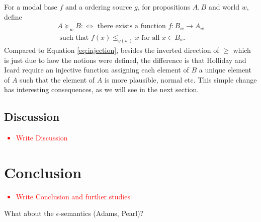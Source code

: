 \documentclass{article}
\theoremstyle{definition}
\newcommand\todo[1]{\textcolor{red}{#1}}
\begin{document}
For a modal base $f$ and a ordering source $g$, for propositions $A,B$ and world $w$, define
\begin{multline}
    \tag{2*}
    \label{eq:lifted-star}
    A \succeq_w B :\iff \text{ there exists a function } f: B_w \rightarrow A_w \\ \text{ such that } f(x) \leq_{g(w)} x \text{ for all } x \in B_w.
\end{multline}
Compared to Equation \ref{eq:injection}, besides the inverted direction of $\geq$ which is just due to how the notions were defined, the difference is that Holliday and Icard require an injective function assigning each element of $B$ a unique element of $A$ such that the element of $A$ is more plausible, normal etc. This simple change has interesting consequences, as we will see in the next section. 
\subsection{Discussion}
\todo{
  \begin{itemize}
    \item Write Discussion
  \end{itemize}
}
\section{Conclusion}
\todo{
  \begin{itemize}
    \item Write Conclusion and further studies
  \end{itemize}
}
What about the $\epsilon$-semantics (Adams, Pearl)? 

\nocite{hamblin59_modal_probab,holliday13_measur,harrison-trainor17_prefer,kratzer91_modal,lassiter10_gradab,yalcin10_probab_operat,kratzer98_seman}
 \printbibliography
\end{document}
